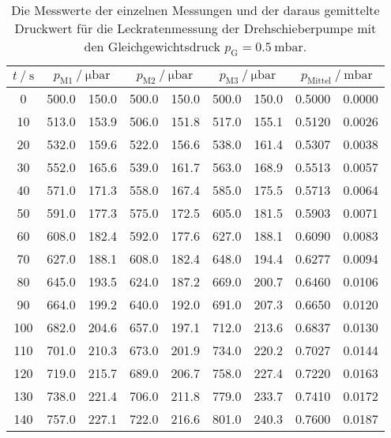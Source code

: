     \begin{table}[h]
      \centering
      \caption{Die Messwerte der einzelnen Messungen und der daraus gemittelte Druckwert für die Leckratenmessung der Drehschieberpumpe mit den 
      Gleichgewichtsdruck $p_\text{G} = \SI{0.5}{\milli\bar}$.}
      \label{tab:dreh_leck_05}
      \begin{tabular}{S[table-format=3.0] S @{${}\pm{}$} S S @{${}\pm{}$} S S @{${}\pm{}$} S S[table-format=1.4] @{${}\pm{}$} S[table-format=1.4]}
      \toprule
      {$t \mathbin{/} \si{\second} $} &  &  &  &  \\
       &  500.0 & 150.0 & 500.0 & 150.0 & 500.0 & 150.0 & 0.5000 & 0.0000 \\  
       10 &  513.0 & 153.9 & 506.0 & 151.8 & 517.0 & 155.1 & 0.5120 & 0.0026 \\
       20 &  532.0 & 159.6 & 522.0 & 156.6 & 538.0 & 161.4 & 0.5307 & 0.0038 \\
       30 &  552.0 & 165.6 & 539.0 & 161.7 & 563.0 & 168.9 & 0.5513 & 0.0057 \\
       40 &  571.0 & 171.3 & 558.0 & 167.4 & 585.0 & 175.5 & 0.5713 & 0.0064 \\
       50 &  591.0 & 177.3 & 575.0 & 172.5 & 605.0 & 181.5 & 0.5903 & 0.0071 \\
       60 &  608.0 & 182.4 & 592.0 & 177.6 & 627.0 & 188.1 & 0.6090 & 0.0083 \\
       70 &  627.0 & 188.1 & 608.0 & 182.4 & 648.0 & 194.4 & 0.6277 & 0.0094 \\
       80 &  645.0 & 193.5 & 624.0 & 187.2 & 669.0 & 200.7 & 0.6460 & 0.0106 \\
       90 &  664.0 & 199.2 & 640.0 & 192.0 & 691.0 & 207.3 & 0.6650 & 0.0120 \\
      100 &  682.0 & 204.6 & 657.0 & 197.1 & 712.0 & 213.6 & 0.6837 & 0.0130 \\
      110 &  701.0 & 210.3 & 673.0 & 201.9 & 734.0 & 220.2 & 0.7027 & 0.0144 \\
      120 &  719.0 & 215.7 & 689.0 & 206.7 & 758.0 & 227.4 & 0.7220 & 0.0163 \\
      130 &  738.0 & 221.4 & 706.0 & 211.8 & 779.0 & 233.7 & 0.7410 & 0.0172 \\
      140 &  757.0 & 227.1 & 722.0 & 216.6 & 801.0 & 240.3 & 0.7600 & 0.0187 \\

\end{tabular}
\end{table}
